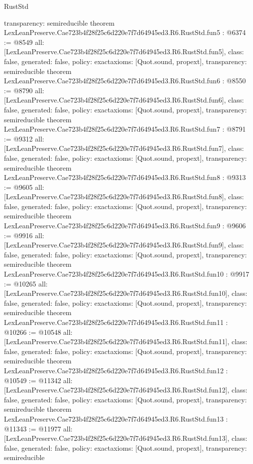 \begin{lexlean}{RustStd}
\begin{coremodule}
{  transparency: semireducible
}
theorem LexLeanPreserve.Cae723b4f28f25c6d220e7f7d64945ed3.R6.RustStd.fun5 : @6374 := @8549 {
  all: [LexLeanPreserve.Cae723b4f28f25c6d220e7f7d64945ed3.R6.RustStd.fun5],
  class: false,
  generated: false,
  policy: exact{axioms: [Quot.sound, propext]},
  transparency: semireducible
}
theorem LexLeanPreserve.Cae723b4f28f25c6d220e7f7d64945ed3.R6.RustStd.fun6 : @8550 := @8790 {
  all: [LexLeanPreserve.Cae723b4f28f25c6d220e7f7d64945ed3.R6.RustStd.fun6],
  class: false,
  generated: false,
  policy: exact{axioms: [Quot.sound, propext]},
  transparency: semireducible
}
theorem LexLeanPreserve.Cae723b4f28f25c6d220e7f7d64945ed3.R6.RustStd.fun7 : @8791 := @9312 {
  all: [LexLeanPreserve.Cae723b4f28f25c6d220e7f7d64945ed3.R6.RustStd.fun7],
  class: false,
  generated: false,
  policy: exact{axioms: [Quot.sound, propext]},
  transparency: semireducible
}
theorem LexLeanPreserve.Cae723b4f28f25c6d220e7f7d64945ed3.R6.RustStd.fun8 : @9313 := @9605 {
  all: [LexLeanPreserve.Cae723b4f28f25c6d220e7f7d64945ed3.R6.RustStd.fun8],
  class: false,
  generated: false,
  policy: exact{axioms: [Quot.sound, propext]},
  transparency: semireducible
}
theorem LexLeanPreserve.Cae723b4f28f25c6d220e7f7d64945ed3.R6.RustStd.fun9 : @9606 := @9916 {
  all: [LexLeanPreserve.Cae723b4f28f25c6d220e7f7d64945ed3.R6.RustStd.fun9],
  class: false,
  generated: false,
  policy: exact{axioms: [Quot.sound, propext]},
  transparency: semireducible
}
theorem LexLeanPreserve.Cae723b4f28f25c6d220e7f7d64945ed3.R6.RustStd.fun10 : @9917 := @10265 {
  all: [LexLeanPreserve.Cae723b4f28f25c6d220e7f7d64945ed3.R6.RustStd.fun10],
  class: false,
  generated: false,
  policy: exact{axioms: [Quot.sound, propext]},
  transparency: semireducible
}
theorem LexLeanPreserve.Cae723b4f28f25c6d220e7f7d64945ed3.R6.RustStd.fun11 : @10266 := @10548 {
  all: [LexLeanPreserve.Cae723b4f28f25c6d220e7f7d64945ed3.R6.RustStd.fun11],
  class: false,
  generated: false,
  policy: exact{axioms: [Quot.sound, propext]},
  transparency: semireducible
}
theorem LexLeanPreserve.Cae723b4f28f25c6d220e7f7d64945ed3.R6.RustStd.fun12 : @10549 := @11342 {
  all: [LexLeanPreserve.Cae723b4f28f25c6d220e7f7d64945ed3.R6.RustStd.fun12],
  class: false,
  generated: false,
  policy: exact{axioms: [Quot.sound, propext]},
  transparency: semireducible
}
theorem LexLeanPreserve.Cae723b4f28f25c6d220e7f7d64945ed3.R6.RustStd.fun13 : @11343 := @11977 {
  all: [LexLeanPreserve.Cae723b4f28f25c6d220e7f7d64945ed3.R6.RustStd.fun13],
  class: false,
  generated: false,
  policy: exact{axioms: [Quot.sound, propext]},
  transparency: semireducible
}
\end{coremodule}
\end{lexlean}
